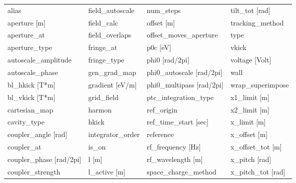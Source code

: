  \begin{tabular}{llll} \toprule
alias                            & field_autoscale                  & num_steps                        & tilt_tot [rad]                   \\
aperture [m]                     & field_calc                       & offset [m]                       & tracking_method                  \\
aperture_at                      & field_overlaps                   & offset_moves_aperture            & type                             \\
aperture_type                    & fringe_at                        & p0c [eV]                         & vkick                            \\
autoscale_amplitude              & fringe_type                      & phi0 [rad/2pi]                   & voltage [Volt]                   \\
autoscale_phase                  & gen_grad_map                     & phi0_autoscale [rad/2pi]         & wall                             \\
bl_hkick [T*m]                   & gradient [eV/m]                  & phi0_multipass [rad/2pi]         & wrap_superimpose                 \\
bl_vkick [T*m]                   & grid_field                       & ptc_integration_type             & x1_limit [m]                     \\
cartesian_map                    & harmon                           & ref_origin                       & x2_limit [m]                     \\
cavity_type                      & hkick                            & ref_time_start [sec]             & x_limit [m]                      \\
coupler_angle [rad]              & integrator_order                 & reference                        & x_offset [m]                     \\
coupler_at                       & is_on                            & rf_frequency [Hz]                & x_offset_tot [m]                 \\
coupler_phase [rad/2pi]          & l [m]                            & rf_wavelength [m]                & x_pitch [rad]                    \\
coupler_strength                 & l_active [m]                     & space_charge_method              & x_pitch_tot [rad]                \\

\end{tabular}
